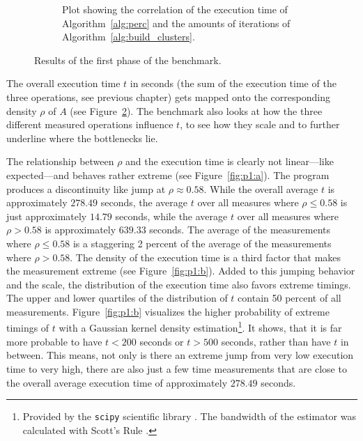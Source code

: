 \documentclass[twoside,11pt]{article}
\begin{document}
\begin{figure}[htbp]
\begin{center}
\begin{subfigure}[b]{0.49\textwidth}
\caption{Plot showing the correlation of the execution time
of Algorithm~\ref{alg:perc} and the amounts of iterations
of Algorithm~\ref{alg:build_clusters}.}
\label{fig:p1:e}
\end{subfigure}

\caption{Results of the first phase of the benchmark.}
\label{fig:p1}
\end{center}
\end{figure}

The overall execution time $t$ in seconds (the sum
of the execution time of the three operations, see previous
chapter) gets mapped onto the corresponding density $\rho$
of $A$ (see Figure~\ref{fig:p1}).
The benchmark also looks at how the three different
measured operations influence $t$, to see how they scale
and to further underline where the bottlenecks lie.

The relationship between $\rho$ and the execution time
is clearly not linear---like expected---and behaves rather
extreme (see Figure~\ref{fig:p1:a}).
The program produces a discontinuity like jump at $\rho
\approx 0.58$.
While the overall average $t$ is approximately
$278.49$ seconds, the average $t$ over all measures where
$\rho \leq 0.58$ is just approximately $14.79$ seconds,
while the average $t$ over all measures where $\rho > 0.58$
is approximately $639.33$ seconds.
The average of the measurements where $\rho \leq 0.58$ is
a staggering 2 percent of the average of the measurements
where $\rho > 0.58$.
The density of the execution time is a third factor that
makes the measurement extreme (see Figure~\ref{fig:p1:b}).
Added to this jumping behavior and the scale, the
distribution of the execution time also favors extreme
timings.
The upper and lower quartiles of the distribution of $t$
contain 50 percent of all measurements.
Figure~\ref{fig:p1:b} visualizes the higher probability of
extreme timings of $t$ with a Gaussian kernel density
estimation\footnote{Provided by the \texttt{scipy}
  scientific library \citep[see][]{scipy}. The bandwidth
  of the estimator was calculated with Scott's Rule
  \citep[see][]{scott}.}.
It shows, that it is far more probable to have $t < 200$
seconds or $t > 500$ seconds, rather than have $t$ in
between.
This means, not only is there an extreme jump from very
low execution time to very high, there are also just a
few time measurements that are close to the overall average
execution time of approximately $278.49$ seconds.
\end{document}

